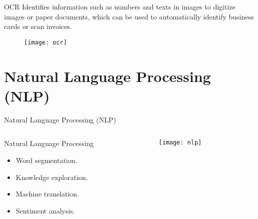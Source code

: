 
\begin{frame}{OCR}
Identifies information such as numbers and texts in images to digitize images or paper documents, which can be used to automatically identify business cards or scan invoices.
\begin{figure}[!]
\centering
\texttt{[image: ocr]}
\end{figure}
\end{frame}

\section{Natural Language Processing (NLP)}

\begin{frame}{Natural Language Processing (NLP)}
\begin{columns}[t]
\begin{column}{.4\textwidth}
Natural Language Processing
\begin{itemize}
\item Word segmentation.
\item Knowledge exploration.
\item Machine translation.
\item Sentiment analysis.
\end{itemize}
\end{column}
\begin{column}{.6\textwidth}
\begin{figure}[!]
\centering
\texttt{[image: nlp]}
\end{figure}
\end{column}
\end{columns}
\end{frame}


